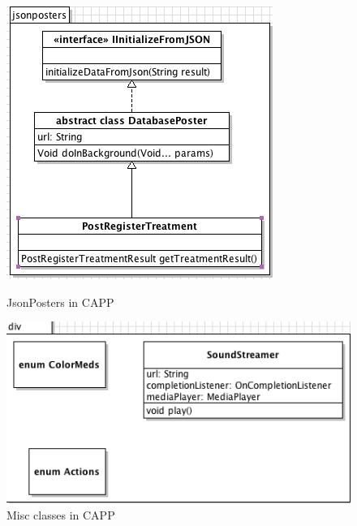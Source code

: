 \begin{figure}
	\begin{minipage}[b]{0.44\linewidth}
		\centering
			\includegraphics[width=\linewidth]{Pictures/ArchPictures/capparchpictures/capp_jsonposters.png}
		\caption{JsonPosters in CAPP}
		\label{fig:class-diagram-child-jsonposters}
	\end{minipage}
	\hspace{0.1\linewidth}
	\begin{minipage}[b]{0.44\linewidth}
		\centering
			\includegraphics[width=\linewidth]{Pictures/ArchPictures/capparchpictures/capp_div.png}
		\caption{Misc classes in CAPP}
		\label{fig:class-diagram-child-misc}
	\end{minipage}
\end{figure}

